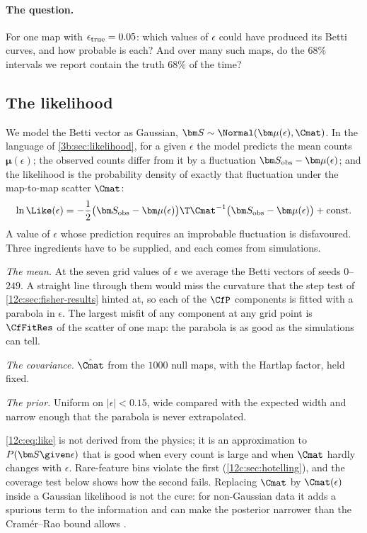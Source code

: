 \paragraph{The question.} For one map with $\epsilon_{\rm true}=0.05$: which values of $\epsilon$ could have produced its Betti
curves, and how probable is each? And over many such maps, do the $68\%$ intervals we report contain the truth $68\%$ of the time?

\subsection{The likelihood}
\label{12c:sec:like}

We model the Betti vector as Gaussian, $\bm S\sim\Normal(\bm\mu(\epsilon),\Cmat)$. In the language of \cref{3b:sec:likelihood}, for a
given $\epsilon$ the model predicts the mean counts $\bm\mu(\epsilon)$; the observed counts differ from it by a fluctuation
$\bm S_{\rm obs}-\bm\mu(\epsilon)$; and the likelihood is the probability density of exactly that fluctuation under the map-to-map
scatter $\Cmat$:
\begin{equation}
  \ln\Like(\epsilon)=-\frac12\bigl(\bm S_{\rm obs}-\bm\mu(\epsilon)\bigr)\T\Cmat^{-1}\bigl(\bm S_{\rm obs}-\bm\mu(\epsilon)\bigr)+\text{const}.
  \label{12c:eq:like}
\end{equation}
A value of $\epsilon$ whose prediction requires an improbable fluctuation is disfavoured. Three ingredients have to be supplied,
and each comes from simulations.

\emph{The mean.} At the seven grid values of $\epsilon$ we average the Betti vectors of seeds $0$--$249$. A straight line through
them would miss the curvature that the step test of \cref{12c:sec:fisher-results} hinted at, so each of the $\CfP$ components is fitted
with a parabola in $\epsilon$. The largest misfit of any component at any grid point is $\CfFitRes$ of the scatter of one map: the
parabola is as good as the simulations can tell.

\emph{The covariance.} $\hat\Cmat$ from the $1000$ null maps, with the Hartlap factor, held fixed.

\emph{The prior.} Uniform on $|\epsilon|<0.15$, wide compared with the expected width and narrow enough that the parabola is
never extrapolated.

\begin{pitfall}
\eqref{12c:eq:like} is not derived from the physics; it is an approximation to $P(\bm S\given\epsilon)$ that is good when every
count is large and when $\Cmat$ hardly changes with $\epsilon$. Rare-feature bins violate the first (\cref{12c:sec:hotelling}), and
the coverage test below shows how the second fails. Replacing $\Cmat$ by $\Cmat(\epsilon)$ inside a Gaussian likelihood is not the
cure: for non-Gaussian data it adds a spurious term to the information and can make the posterior narrower than the Cram\'er--Rao
bound allows \cite{Carron2013}.
\end{pitfall}

